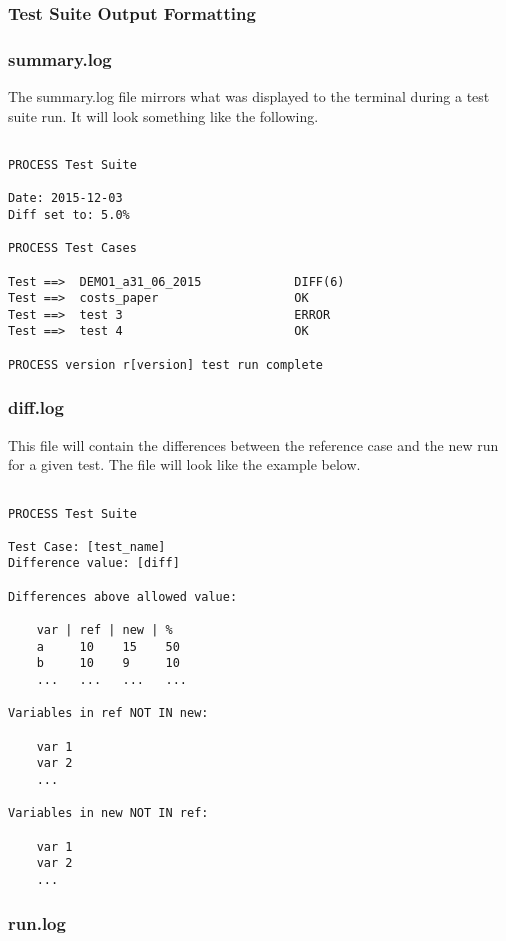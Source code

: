 \subsubsection{Test Suite Output Formatting}

\subsubsection*{summary.log}

The summary.log file mirrors what was displayed to the terminal during a test suite run. It will look something like the following.

\begin{verbatim}

PROCESS Test Suite

Date: 2015-12-03
Diff set to: 5.0%

PROCESS Test Cases

Test ==>  DEMO1_a31_06_2015             DIFF(6)
Test ==>  costs_paper                   OK
Test ==>  test 3                        ERROR
Test ==>  test 4                        OK

PROCESS version r[version] test run complete

\end{verbatim}

\subsubsection*{diff.log}

This file will contain the differences between the reference case and the new run for a given test. The file will look like the example below.

\begin{verbatim}

PROCESS Test Suite

Test Case: [test_name]
Difference value: [diff]

Differences above allowed value:

    var | ref | new | %
    a     10    15    50
    b     10    9     10
    ...   ...   ...   ...

Variables in ref NOT IN new:

    var 1
    var 2
    ...

Variables in new NOT IN ref:

    var 1
    var 2
    ...

\end{verbatim}

\subsubsection*{run.log}

